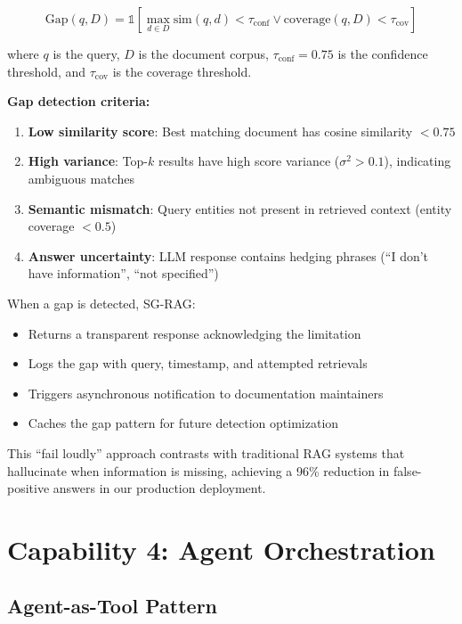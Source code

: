 \documentclass[11pt,a4paper]{article}
\theoremstyle{definition}
\theoremstyle{remark}
\newcommand{\sgrag}{\textsc{SG-RAG}\xspace}
\begin{document}
\begin{equation}
\text{Gap}(q, D) = \mathbb{1}\left[\max_{d \in D} \text{sim}(q, d) < \tau_{\text{conf}} \lor \text{coverage}(q, D) < \tau_{\text{cov}}\right]
\end{equation}

where $q$ is the query, $D$ is the document corpus, $\tau_{\text{conf}} = 0.75$ is the confidence threshold, and $\tau_{\text{cov}}$ is the coverage threshold.

\textbf{Gap detection criteria:}
\begin{enumerate}
    \item \textbf{Low similarity score}: Best matching document has cosine similarity $< 0.75$
    \item \textbf{High variance}: Top-$k$ results have high score variance ($\sigma^2 > 0.1$), indicating ambiguous matches
    \item \textbf{Semantic mismatch}: Query entities not present in retrieved context (entity coverage $< 0.5$)
    \item \textbf{Answer uncertainty}: LLM response contains hedging phrases (``I don't have information'', ``not specified'')
\end{enumerate}

When a gap is detected, \sgrag:
\begin{itemize}
    \item Returns a transparent response acknowledging the limitation
    \item Logs the gap with query, timestamp, and attempted retrievals
    \item Triggers asynchronous notification to documentation maintainers
    \item Caches the gap pattern for future detection optimization
\end{itemize}

This ``fail loudly'' approach contrasts with traditional RAG systems that hallucinate when information is missing, achieving a 96\% reduction in false-positive answers in our production deployment.

\section{Capability 4: Agent Orchestration}
\label{sec:orchestration}

\subsection{Agent-as-Tool Pattern}
\end{document}

